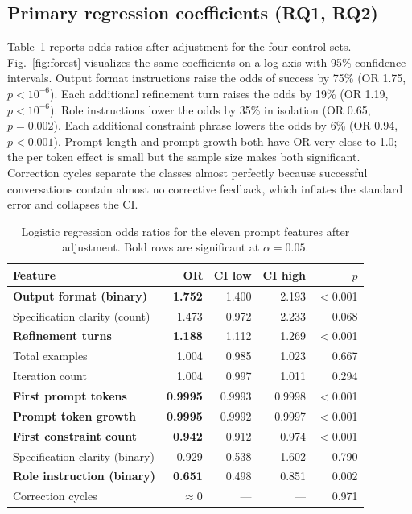 \documentclass[conference]{IEEEtran}
\begin{document}
\subsection{Primary regression coefficients (RQ1, RQ2)}
Table~\ref{tab:or} reports odds ratios after adjustment for the four control sets. Fig.~\ref{fig:forest} visualizes the same coefficients on a log axis with 95\% confidence intervals. Output format instructions raise the odds of success by 75\% (OR 1.75, $p < 10^{-6}$). Each additional refinement turn raises the odds by 19\% (OR 1.19, $p < 10^{-6}$). Role instructions lower the odds by 35\% in isolation (OR 0.65, $p = 0.002$). Each additional constraint phrase lowers the odds by 6\% (OR 0.94, $p < 0.001$). Prompt length and prompt growth both have OR very close to 1.0; the per token effect is small but the sample size makes both significant. Correction cycles separate the classes almost perfectly because successful conversations contain almost no corrective feedback, which inflates the standard error and collapses the CI.

\begin{table}[t]
\centering
\caption{Logistic regression odds ratios for the eleven prompt features after adjustment. Bold rows are significant at $\alpha = 0.05$.}
\label{tab:or}
\footnotesize
\begin{tabular}{lrrrr}
\toprule
Feature & OR & CI low & CI high & $p$ \\
\midrule
\textbf{Output format (binary)}              & \textbf{1.752} & 1.400 & 2.193 & $<$0.001 \\
Specification clarity (count)                & 1.473 & 0.972 & 2.233 & 0.068 \\
\textbf{Refinement turns}                    & \textbf{1.188} & 1.112 & 1.269 & $<$0.001 \\
Total examples                               & 1.004 & 0.985 & 1.023 & 0.667 \\
Iteration count                              & 1.004 & 0.997 & 1.011 & 0.294 \\
\textbf{First prompt tokens}                 & \textbf{0.9995} & 0.9993 & 0.9998 & $<$0.001 \\
\textbf{Prompt token growth}                 & \textbf{0.9995} & 0.9992 & 0.9997 & $<$0.001 \\
\textbf{First constraint count}              & \textbf{0.942} & 0.912 & 0.974 & $<$0.001 \\
Specification clarity (binary)               & 0.929 & 0.538 & 1.602 & 0.790 \\
\textbf{Role instruction (binary)}           & \textbf{0.651} & 0.498 & 0.851 & 0.002 \\
Correction cycles                            & $\approx 0$ & --- & --- & 0.971 \\
\bottomrule
\end{tabular}
\end{table}
\end{document}
